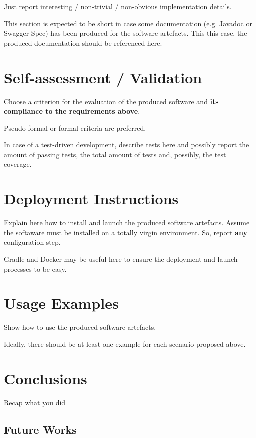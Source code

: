 \documentclass{scrartcl}
\begin{document}
Just report interesting / non-trivial / non-obvious implementation details.

This section is expected to be short in case some documentation (e.g. Javadoc or Swagger Spec) has been produced for the software artefacts.
%
This this case, the produced documentation should be referenced here.

\section{Self-assessment / Validation}

Choose a criterion for the evaluation of the produced software and \textbf{its compliance to the requirements above}.

Pseudo-formal or formal criteria are preferred.

In case of a test-driven development, describe tests here and possibly report the amount of passing tests, the total amount of tests and, possibly, the test coverage.

\section{Deployment Instructions}

Explain here how to install and launch the produced software artefacts.
%
Assume the softaware must be installed on a totally virgin environment.
%
So, report \textbf{any} configuration step.

Gradle and Docker may be useful here to ensure the deployment and launch processes to be easy.

\section{Usage Examples}

Show how to use the produced software artefacts.

Ideally, there should be at least one example for each scenario proposed above.

\section{Conclusions}

Recap what you did

\subsection{Future Works}
\end{document}
